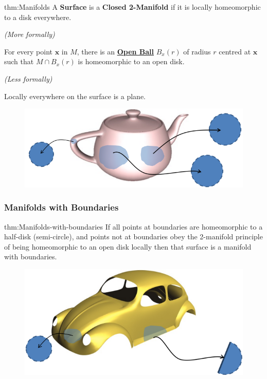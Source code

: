 \documentclass{article}
\begin{document}
\begin{defin}[Manifolds]{thm:Manifolds}
    A \textbf{Surface} is a \textbf{Closed 2-Manifold} if it is locally homeomorphic to a disk everywhere.

    \vspace{5px}

    \textit{(More formally)}

    For every point \(\mathbf{x}\) in \(M\), there is an \hyperref[thm:open-surfaces]{\textbf{Open Ball}}
    \(B_{x}(r)\) of radius \(r\) centred at \(\mathbf{x}\) such that \(M \cap B_{x}(r)\)
    is homeomorphic to an open disk.

    \vspace{10px}

    \textit{(Less formally)}

    Locally everywhere on the surface is a plane.
\end{defin}

\begin{figure}[!ht]
    \centering
    \includegraphics[width=0.5\linewidth]{images/2-manifold.png}
\end{figure}

\subsubsection{Manifolds with Boundaries}
\vspace{10px}
\begin{defin}{thm:Manifolds-with-boundaries}
    If all points at boundaries are homeomorphic to a half-disk (semi-circle), and points not at boundaries obey
    the 2-manifold principle of being homeomorphic to an open disk locally then that surface is a manifold with
    boundaries.
\end{defin}

\begin{figure}[!ht]
    \centering
    \includegraphics[width=0.5\linewidth]{images/manifold_with_boundaries.png}
\end{figure}
\end{document}
